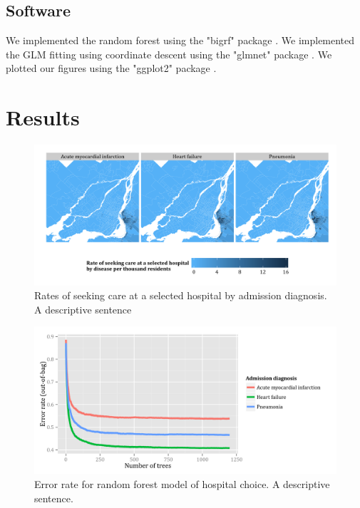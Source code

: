 \documentclass[]{article}
\begin{document}
\subsection{Software}
We implemented the random forest using the "bigrf" \cite{lim_bigrf_2014} package . We implemented the GLM fitting using coordinate descent using the "glmnet" package \cite{friedman_regularization_2010}. We plotted our figures using the "ggplot2" package \cite{wickham_ggplot2_2009}.


\section{Results}
\begin{figure}[H]
    \includegraphics{../figures/hosp_choro.png}
    \caption[Rates of seeking care at a selected hospital by admission diagnosis.]
      {Rates of seeking care at a selected hospital by admission diagnosis. A descriptive sentence}
    \label{fig:hosp_choro}
\end{figure}

\begin{figure}[H]
    \includegraphics{../figures/error_rate_for_hospital_choice.png}
    \caption[Error rate for random forest model of hospital choice.]
      {Error rate for random forest model of hospital choice. A descriptive sentence.}
    \label{fig:error_rate_for_hospital_choice}
\end{figure}
\end{document}
